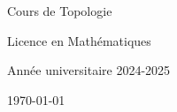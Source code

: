 \begin{titlepage}
    \centering
    \vspace*{1cm}

    \Huge
    Cours de Topologie

    \vspace{0.5cm}

    \LARGE
    Licence en Mathématiques

    \vspace{1.5cm}


    \vfill

    \Large
    Année universitaire 2024-2025

    \vspace{0.8cm}

    \today
\end{titlepage}
